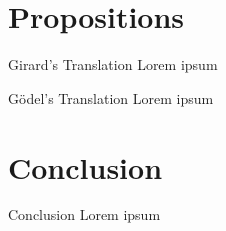 \documentclass{beamer}
\theoremstyle{definition}
\begin{document}
  \section{Propositions}
  \begin{frame}{Girard's Translation}
    Lorem ipsum
  \end{frame}
  \begin{frame}{Gödel's Translation}
    Lorem ipsum
  \end{frame}

  \section{Conclusion}
  \begin{frame}{Conclusion}
    Lorem ipsum
  \end{frame}
\end{document}
